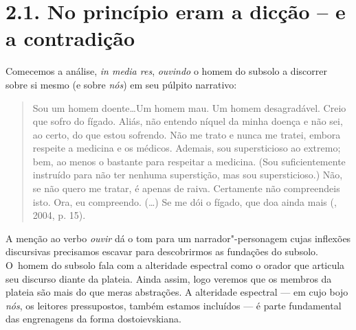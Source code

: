 
\section{2.1. No princípio eram a dicção -- e a contradição}

Comecemos a análise, \emph{in media res}, \emph{ouvindo} o homem do
subsolo a discorrer sobre si mesmo (e sobre \emph{nós}) em seu púlpito
narrativo:

\begin{quote}
Sou um homem doente\ldots Um homem mau. Um homem desagradável. Creio que
sofro do fígado. Aliás, não entendo níquel da minha doença e não sei, ao
certo, do que estou sofrendo. Não me trato e nunca me tratei, embora
respeite a medicina e os médicos. Ademais, sou supersticioso ao extremo;
bem, ao menos o bastante para respeitar a medicina. (Sou suficientemente
instruído para não ter nenhuma superstição, mas sou supersticioso.) Não,
se não quero me tratar, é apenas de raiva. Certamente não compreendeis
isto. Ora, eu compreendo. (\ldots) Se me dói o fígado, que doa ainda mais
(, 2004, p. 15).
\end{quote}

A menção ao verbo \emph{ouvir} dá o tom para um narrador"-personagem
cujas inflexões discursivas precisamos escavar para descobrirmos as
fundações do subsolo. O~homem do subsolo fala com a alteridade espectral
como o orador que articula seu discurso diante da plateia. Ainda assim,
logo veremos que os membros da plateia são mais do que meras abstrações.
A alteridade espectral --- em cujo bojo \emph{nós}, os leitores
pressupostos, também estamos incluídos --- é parte fundamental das
engrenagens da forma dostoievskiana.

